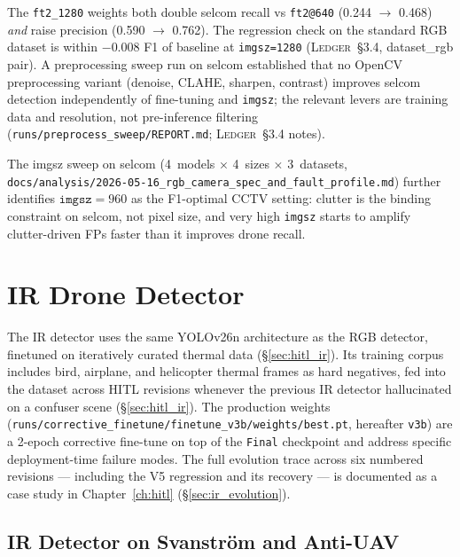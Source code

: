 \documentclass[12pt,a4paper,oneside,openright]{book}
\begin{document}
The \texttt{ft2\_1280} weights both double selcom recall vs \texttt{ft2@640} (0.244 $\to$ 0.468) \emph{and} raise precision (0.590 $\to$ 0.762). The regression check on the standard RGB dataset is within $-0.008$ F1 of baseline at \texttt{imgsz=1280} (\textsc{Ledger}~\S3.4, dataset\_rgb pair). A preprocessing sweep run on selcom established that no OpenCV preprocessing variant (denoise, CLAHE, sharpen, contrast) improves selcom detection independently of fine-tuning and \texttt{imgsz}; the relevant levers are training data and resolution, not pre-inference filtering (\texttt{runs/preprocess\_sweep/REPORT.md}; \textsc{Ledger}~\S3.4 notes).

The imgsz sweep on selcom (4~models $\times$ 4~sizes $\times$ 3~datasets, \texttt{docs/analysis/2026-05-16\_rgb\_camera\_spec\_and\_fault\_profile.md}) further identifies $\mathtt{imgsz}=960$ as the F1-optimal CCTV setting: clutter is the binding constraint on selcom, not pixel size, and very high \texttt{imgsz} starts to amplify clutter-driven FPs faster than it improves drone recall.

\section{IR Drone Detector}
\label{sec:ir_detector}

The IR detector uses the same YOLOv26n architecture as the RGB detector, finetuned on iteratively curated thermal data (\S\ref{sec:hitl_ir}). Its training corpus includes bird, airplane, and helicopter thermal frames as hard negatives, fed into the dataset across HITL revisions whenever the previous IR detector hallucinated on a confuser scene (\S\ref{sec:hitl_ir}). The production weights (\texttt{runs/corrective\_finetune/finetune\_v3b/weights/best.pt}, hereafter \texttt{v3b}) are a 2-epoch corrective fine-tune on top of the \texttt{Final} checkpoint and address specific deployment-time failure modes. The full evolution trace across six numbered revisions --- including the V5 regression and its recovery --- is documented as a case study in Chapter~\ref{ch:hitl} (\S\ref{sec:ir_evolution}).

\subsection{IR Detector on Svanstr\"om and Anti-UAV}
\end{document}
